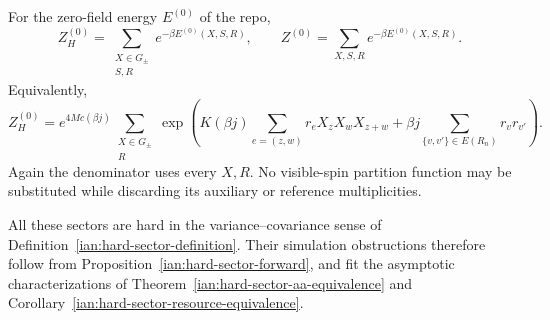 For the zero-field energy \(E^{(0)}\) of the repo,
\[
 Z_H^{(0)}
 =\sum_{\substack{X\in G_\pm\\S,R}}
 e^{-\beta E^{(0)}(X,S,R)},\qquad
 Z^{(0)}=\sum_{X,S,R}e^{-\beta E^{(0)}(X,S,R)}.
\]
Equivalently,
\[
 Z_H^{(0)}
 =e^{4Mc(\beta j)}
 \sum_{\substack{X\in G_\pm\\R}}
 \exp\left(
 K(\beta j)\sum_{e=(z,w)}r_eX_zX_wX_{z+w}
 +\beta j\sum_{\{v,v'\}\in E(R_n)}r_vr_{v'}\right).
\]
Again the denominator uses every \(X,R\). No visible-spin partition
function may be substituted while discarding its auxiliary or
reference multiplicities.

All these sectors are hard in the variance--covariance sense of
Definition~\ref{ian:hard-sector-definition}. Their simulation
obstructions therefore follow from
Proposition~\ref{ian:hard-sector-forward}, and fit the asymptotic
characterizations of Theorem~\ref{ian:hard-sector-aa-equivalence} and Corollary~\ref{ian:hard-sector-resource-equivalence}.
